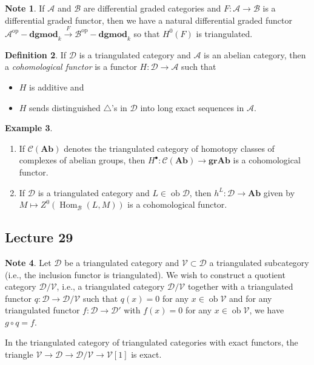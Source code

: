 \documentclass[10pt,letterpaper,cm]{nupset}
\theoremstyle{definition}
\newtheorem{definition}{Definition}[subsection]
\newtheorem{exmp}[definition]{Example}
\newtheorem{note}[definition]{Note}
\theoremstyle{theorem}
\theoremstyle{remark}
\newcommand{\1}{\mathbf{1}}
\renewcommand{\a}{\mathscr{A}}
\renewcommand{\b}{\mathscr{B}}
\renewcommand{\d}{\mathscr{D}}
\renewcommand{\v}{\mathscr{V}}
\newcommand{\0}{\vec 0}
\DeclareMathOperator{\op}{op}
\DeclareMathOperator{\ob}{ob}
\DeclareMathOperator{\Hom}{Hom}
\begin{document}
\begin{note}
If $ \a$ and $\b$ are differential graded categories and $F: \a \to \b$ is a differential graded functor, then we have a natural differential graded functor $\a^{\op}{-}\mathbf{dgmod}_k \overset{F}{\longrightarrow} \b^{\op}{-}\mathbf{dgmod}_k$ so that $H^0(F)$ is triangulated.
\end{note}

\begin{definition}
If $\d$ is a triangulated category and $\a$ is an abelian category, then a \textit{cohomological functor} is a functor $H : \d \to \a$ such that 
\begin{itemize}
\item $H$ is additive and
\item  $H$ sends distinguished $\triangle$'s in $\d$ into long exact sequences in $\a$.
\end{itemize}
\end{definition}

\begin{exmp} $ $
\begin{enumerate}
\item If $\mathcal{C}(\mathbf{Ab})$ denotes the triangulated category of homotopy classes of complexes of abelian groups, then $H^{\bullet} : \mathcal{C}(\mathbf{Ab}) \to \mathbf{gr}\mathbf{Ab}$ is a cohomological functor.
\item If $\d$ is a triangulated category and $L \in \ob{\d}$, then $h^L : \d \to \mathbf{Ab}$ given by $M \mapsto Z^0(\Hom_{\b}(L, M))$ is a cohomological functor. 
\end{enumerate}
\end{exmp}

\subsection{Lecture 29}

\begin{note}
Let $\d$ be a triangulated category and $\v \subset \d$ a triangulated subcategory (i.e., the inclusion functor is triangulated). We wish to construct a quotient category $\d/\v$, i.e., a triangulated category $\d/\v$ together with a triangulated functor $q : \d \to \d/\v$ such that $q(x) = 0$ for any $x \in \ob{\v}$ and for any triangulated functor $f: \d \to \d'$ with $f(x) =0$ for any $x \in \ob{\v}$, we have $g \circ q= f$.

In the triangulated category of triangulated categories with exact functors, the triangle $\v \to \d \to \d/\v \to \v[1]$ is exact.
\end{note}
\end{document}
